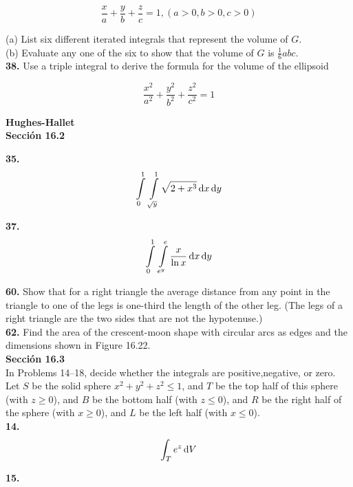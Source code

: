 \documentclass[11pt]{report}
\begin{document}
\[ \frac{x}{a} + \frac{y}{b} + \frac{z}{c} = 1, (a > 0, b > 0, c > 0) \]

(a) List six different iterated integrals that represent the volume of $G$. \\

(b) Evaluate any one of the six to show that the volume of $G$ is $\frac{1}{6} abc$. \\

\textbf{38.} Use a triple integral to derive the formula for the volume of the ellipsoid

\[ \frac{x^2}{a^2} + \frac{y^2}{b^2} + \frac{z^2}{c^2} = 1 \]

\textbf{Hughes-Hallet} \\

\textbf{Sección 16.2}

\textbf{35.} \\

\[ \int \limits_0^1 \, \int \limits_{\sqrt{y}}^1 \sqrt{2 + x^3} \, \text dx \, \text dy \]

\textbf{37.} \\

\[ \int \limits_0^1 \, \int \limits_{e^y}^e \frac{x}{\ln{x}} \, \text dx \, \text dy \]

\textbf{60.} Show that for a right triangle the average distance from any point
in the triangle to one of the legs is one-third the length of the other leg.
(The legs of a right triangle are the two sides that are not the hypotenuse.) \\

\textbf{62.} Find the area of the crescent-moon shape with circular arcs as edges
and the dimensions shown in Figure 16.22. \\

\textbf{Sección 16.3} \\

In Problems 14–18, decide whether the integrals are positive,negative, or zero.
Let $S$ be the solid sphere $x^2 + y^2 + z^2 \leq 1$, and $T$ be the top half of
this sphere (with $z \geq 0$), and $B$ be the bottom half (with $z \leq 0$), and $R$
be the right half of the sphere (with $x \geq 0$), and $L$ be the left half
(with $x \leq 0$). \\

\textbf{14.} \\

\[ \int _T e^z \, \text dV \]

\textbf{15.} \\
\end{document}
